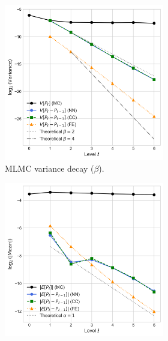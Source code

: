\begin{figure}[htbp]
    \centering
    \begin{subfigure}{\textwidth}
        \centering
        \begin{subfigure}[b]{0.48\textwidth}
            \centering
            \includegraphics[width=\linewidth]{graphics/she_energy_var_decay.png}
            \caption{MLMC variance decay ($\beta$).}
            \label{fig:variance_decay}
        \end{subfigure}
        \hfill
        \begin{subfigure}[b]{0.48\textwidth}
            \centering
            \includegraphics[width=\linewidth]{graphics/she_energy_err_decay.png}

\end{subfigure}
\end{subfigure}
\end{figure}
